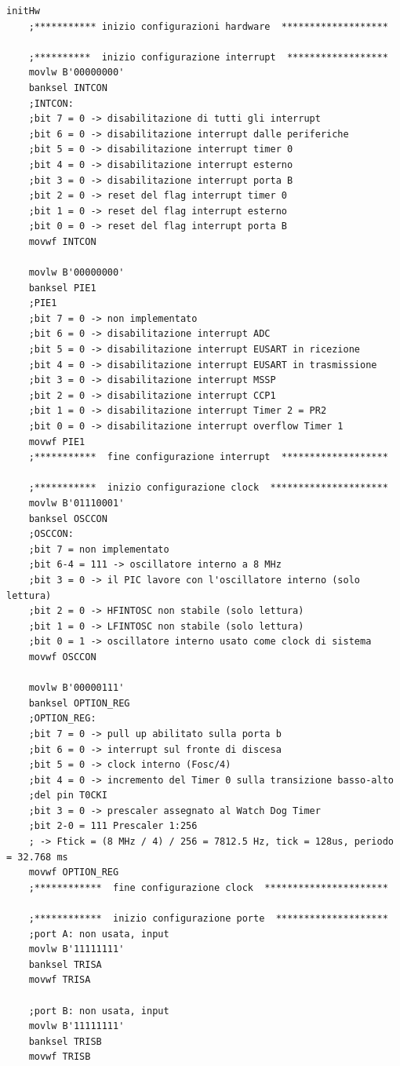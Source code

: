 \documentclass{article}
\begin{document}
	\begin{lstlisting}[frame=single]
initHw
	;*********** inizio configurazioni hardware  *******************		
	
	;**********  inizio configurazione interrupt  ******************
	movlw B'00000000'
	banksel INTCON
	;INTCON:
	;bit 7 = 0 -> disabilitazione di tutti gli interrupt
	;bit 6 = 0 -> disabilitazione interrupt dalle periferiche
	;bit 5 = 0 -> disabilitazione interrupt timer 0
	;bit 4 = 0 -> disabilitazione interrupt esterno 
	;bit 3 = 0 -> disabilitazione interrupt porta B
	;bit 2 = 0 -> reset del flag interrupt timer 0 
	;bit 1 = 0 -> reset del flag interrupt esterno
	;bit 0 = 0 -> reset del flag interrupt porta B
	movwf INTCON
	
	movlw B'00000000'
	banksel PIE1
	;PIE1
	;bit 7 = 0 -> non implementato
	;bit 6 = 0 -> disabilitazione interrupt ADC
	;bit 5 = 0 -> disabilitazione interrupt EUSART in ricezione
	;bit 4 = 0 -> disabilitazione interrupt EUSART in trasmissione
	;bit 3 = 0 -> disabilitazione interrupt MSSP
	;bit 2 = 0 -> disabilitazione interrupt CCP1
	;bit 1 = 0 -> disabilitazione interrupt Timer 2 = PR2
	;bit 0 = 0 -> disabilitazione interrupt overflow Timer 1
	movwf PIE1
	;***********  fine configurazione interrupt  *******************
	
	;***********  inizio configurazione clock  *********************
	movlw B'01110001'
	banksel OSCCON
	;OSCCON:
	;bit 7 = non implementato
	;bit 6-4 = 111 -> oscillatore interno a 8 MHz
	;bit 3 = 0 -> il PIC lavore con l'oscillatore interno (solo	lettura)
	;bit 2 = 0 -> HFINTOSC non stabile (solo lettura)
	;bit 1 = 0 -> LFINTOSC non stabile (solo lettura)
	;bit 0 = 1 -> oscillatore interno usato come clock di sistema
	movwf OSCCON
	
	movlw B'00000111'
	banksel OPTION_REG
	;OPTION_REG:
	;bit 7 = 0 -> pull up abilitato sulla porta b
	;bit 6 = 0 -> interrupt sul fronte di discesa 
	;bit 5 = 0 -> clock interno (Fosc/4)
	;bit 4 = 0 -> incremento del Timer 0 sulla transizione basso-alto
	;del pin T0CKI
	;bit 3 = 0 -> prescaler assegnato al Watch Dog Timer
	;bit 2-0 = 111 Prescaler 1:256
	; -> Ftick = (8 MHz / 4) / 256 = 7812.5 Hz, tick = 128us, periodo = 32.768 ms
	movwf OPTION_REG
	;************  fine configurazione clock  **********************
	
	;************  inizio configurazione porte  ********************
	;port A: non usata, input
	movlw B'11111111'
	banksel TRISA
	movwf TRISA
	
	;port B: non usata, input
	movlw B'11111111'
	banksel TRISB
	movwf TRISB
	

\end{lstlisting}
\end{document}
